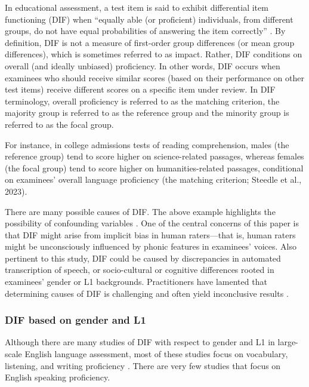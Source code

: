 \documentclass [PhD] {uclathes}
\begin{document}
In educational assessment, a test item is said to exhibit differential item functioning (DIF) when “equally able (or proficient) individuals, from different groups, do not have equal probabilities of answering the item correctly” \citep[][p. 4]{angoff1993}. By definition, DIF is not a measure of first-order group differences (or mean group differences), which is sometimes referred to as impact. Rather, DIF conditions on overall (and ideally unbiased) proficiency. In other words, DIF occurs when examinees who should receive similar scores (based on their performance on other test items) receive different scores on a specific item under review. In DIF terminology, overall proficiency is referred to as the matching criterion, the majority group is referred to as the reference group and the minority group is referred to as the focal group.

For instance, in college admissions tests of reading comprehension, males (the reference group) tend to score higher on science-related passages, whereas females (the focal group) tend to score higher on humanities-related passages, conditional on examinees’ overall language proficiency (the matching criterion; Steedle et al., 2023). 

There are many possible causes of DIF. The above example highlights the possibility of confounding variables \citep[e.g. males tend to major in STEM at a higher rate;][]{sloane2021college}. One of the central concerns of this paper is that DIF might arise from implicit bias in human raters—that is, human raters might be unconsciously influenced by phonic features in examinees’ voices. Also pertinent to this study, DIF could be caused by discrepancies in automated transcription of speech, or socio-cultural or cognitive differences rooted in examinees’ gender or L1 backgrounds. Practitioners have lamented that determining causes of DIF is challenging and often yield inconclusive results \citep{zumbo2007}. 

\subsubsection{DIF based on gender and L1}

Although there are many studies of DIF with respect to gender and L1 in large-scale English language assessment, most of these studies focus on vocabulary, listening, and writing proficiency \citep{kunnan2017evaluating}. There are very few studies that focus on English speaking proficiency. 
\end{document}
